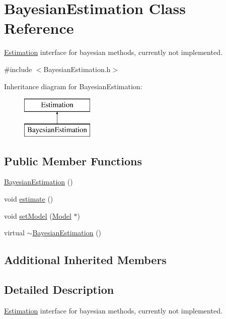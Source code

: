 \hypertarget{classBayesianEstimation}{}\section{Bayesian\+Estimation Class Reference}
\label{classBayesianEstimation}


\hyperlink{classEstimation}{Estimation} interface for bayesian methods, currently not implemented.  




{\ttfamily \#include $<$Bayesian\+Estimation.\+h$>$}

Inheritance diagram for Bayesian\+Estimation\+:\begin{figure}[H]
\begin{center}
\leavevmode
\includegraphics[height=2.000000cm]{classBayesianEstimation}
\end{center}
\end{figure}
\subsection*{Public Member Functions}
\begin{DoxyCompactItemize}
\item 
\hyperlink{classBayesianEstimation_a385093a7d842d5fc1acbb33525b157cf}{Bayesian\+Estimation} ()
\item 
void \hyperlink{classBayesianEstimation_a363ef2a057fe5b20f8724a7ddbb3463b}{estimate} ()
\item 
void \hyperlink{classBayesianEstimation_a46020e91ec07e5e81560fa159a37be16}{set\+Model} (\hyperlink{classModel}{Model} $\ast$)
\item 
virtual \hyperlink{classBayesianEstimation_a8fffb82058cb614a4b20698c24b18cd7}{$\sim$\+Bayesian\+Estimation} ()
\end{DoxyCompactItemize}
\subsection*{Additional Inherited Members}


\subsection{Detailed Description}
\hyperlink{classEstimation}{Estimation} interface for bayesian methods, currently not implemented. 


